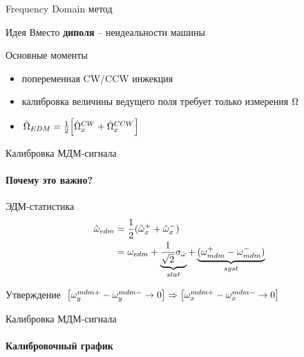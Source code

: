 \documentclass[14pt]{beamer}
\begin{document}
\begin{frame}{Frequency Domain метод}
	\begin{block}{Идея}
		\centering	Вместо \textbf{диполя} -- неидеальности машины
	\end{block}
	\begin{block}{Основные моменты} 
		\begin{itemize}
			\item попеременная CW/CCW инжекция
			\item калибровка величины ведущего поля требует только измерения $\Omega$
			\item $\hat {\Omega}_{EDM} = \frac12\Big[\hat{\Omega}_x^{CW} + \hat{\Omega}_x^{CCW}\Big]$
		\end{itemize}
	\end{block}
\end{frame}
\begin{frame}{Калибровка МДМ-сигнала}
	\framesubtitle{Почему это важно?}
	\begin{block}{ЭДМ-статистика}
		\begin{align*}
		\hat{\omega}_{edm} &= \frac12(\hat{\omega}_x^+ + \hat{\omega}_x^-) \\
		&= \omega_{edm} + \underbrace{\frac{1}{\sqrt2}\sigma_{\hat{\omega}}}_{stat} + \underbrace{(\omega_{mdm}^+ - \omega_{mdm}^-)}_{syst}
		\end{align*}
	\end{block}
	\begin{block}{Утверждение}
		$\left[\omega_y^{mdm+} - \omega_y^{mdm-} \to 0\right] \Rightarrow \left[\omega_x^{mdm+} - \omega_x^{mdm-} \to 0\right]$
	\end{block}
\end{frame}
\begin{frame}{Калибровка МДМ-сигнала}
	\framesubtitle{Калибровочный график}
	\centering
\end{frame}
\end{document}
